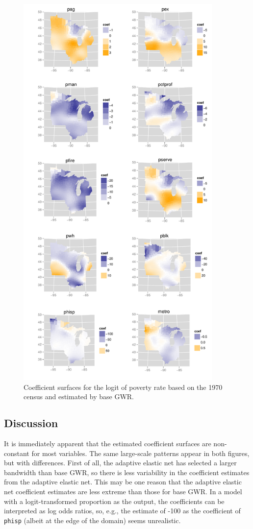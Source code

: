 \documentclass[authoryear, review, 11pt]{elsarticle}
\begin{document}
	\begin{figure}
		\begin{center}
			\includegraphics[height=8in]{../../figures/poverty/1970.gwr.pdf}
			\caption{Coefficient surfaces for the logit of poverty rate based on the 1970 census and estimated by base GWR. \label{fig:gwr-coefs-1970}}
		\end{center}
	\end{figure}	
			
	\subsection{Discussion}
	It is immediately apparent that the estimated coefficient surfaces are non-constant for most variables. The same large-scale patterns appear in both figures, but with differences. First of all, the adaptive elastic net has selected a larger bandwidth than base GWR, so there is less variability in the coefficient estimates from the adaptive elastic net. This may be one reason that the adaptive elastic net coefficient estimates are less extreme than those for base GWR. In a model with a logit-transformed proportion as the output, the coefficients can be interpreted as log odds ratios, so, e.g., the estimate of -100 as the coefficient of \verb!phisp! (albeit at the edge of the domain) seems unrealistic.\\
	
\end{document}
